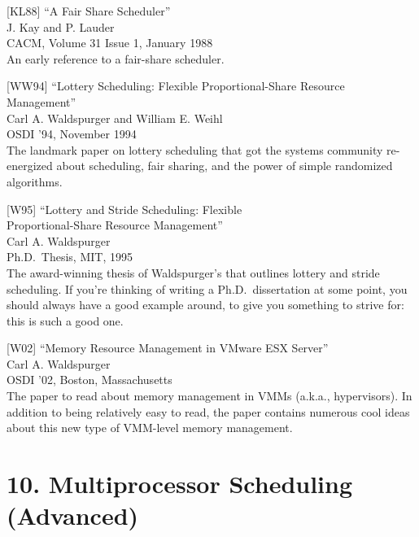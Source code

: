 {[}KL88{]} ``A Fair Share Scheduler''\\
J. Kay and P. Lauder\\
CACM, Volume 31 Issue 1, January 1988\\
An early reference to a fair-share scheduler.

{[}WW94{]} ``Lottery Scheduling: Flexible Proportional-Share Resource
Management''\\
Carl A. Waldspurger and William E. Weihl\\
OSDI '94, November 1994\\
The landmark paper on lottery scheduling that got the systems community
re-energized about scheduling, fair sharing, and the power of simple
randomized algorithms.

{[}W95{]} ``Lottery and Stride Scheduling: Flexible\\
Proportional-Share Resource Management''\\
Carl A. Waldspurger\\
Ph.D.~Thesis, MIT, 1995\\
The award-winning thesis of Waldspurger's that outlines lottery and
stride scheduling. If you're thinking of writing a Ph.D.~dissertation at
some point, you should always have a good example around, to give you
something to strive for: this is such a good one.

{[}W02{]} ``Memory Resource Management in VMware ESX Server''\\
Carl A. Waldspurger\\
OSDI '02, Boston, Massachusetts\\
The paper to read about memory management in VMMs (a.k.a., hypervisors).
In addition to being relatively easy to read, the paper contains
numerous cool ideas about this new type of VMM-level memory management.

\hypertarget{multiprocessor-scheduling-advanced}{%
\section*{10. Multiprocessor Scheduling
(Advanced)}\label{multiprocessor-scheduling-advanced}}

